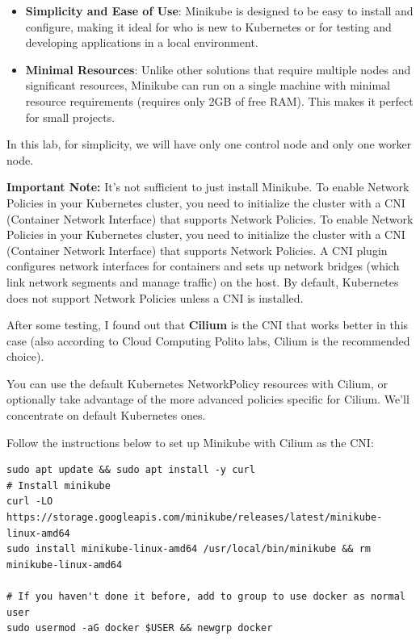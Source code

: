 \documentclass{article}
\begin{document}
\begin{enumerate}
    \begin{itemize}
        \item \textbf{Simplicity and Ease of Use}: Minikube is designed to be easy to install and configure, making it ideal for who is new to Kubernetes or for testing and developing applications in a local environment.
        \item \textbf{Minimal Resources}: Unlike other solutions that require multiple nodes and significant resources, Minikube can run on a single machine with minimal resource requirements (requires only 2GB of free RAM). This makes it perfect for small projects.
    \end{itemize}
    In this lab, for simplicity, we will have only one control node and only one worker node.

      \textbf{Important Note:} It's not sufficient to just install Minikube. To enable Network Policies in your Kubernetes cluster, you need to initialize the cluster with a CNI (Container Network Interface) that supports Network Policies. To enable Network Policies in your Kubernetes cluster, you need to initialize the cluster with a CNI (Container Network Interface) that supports Network Policies. A CNI plugin configures network interfaces for containers and sets up network bridges (which link network segments and manage traffic) on the host. By default, Kubernetes does not support Network Policies unless a CNI is installed. 
      
      After some testing, I found out that \textbf{Cilium} is the CNI that works better in this case (also according to Cloud Computing Polito labs, Cilium is the recommended choice).
      
      You can use the default Kubernetes NetworkPolicy resources with Cilium, or optionally take advantage of the more advanced policies specific for Cilium. We'll concentrate on default Kubernetes ones.
  
      Follow the instructions below to set up Minikube with Cilium as the CNI:
  
      \begin{lstlisting}
sudo apt update && sudo apt install -y curl
# Install minikube
curl -LO https://storage.googleapis.com/minikube/releases/latest/minikube-linux-amd64
sudo install minikube-linux-amd64 /usr/local/bin/minikube && rm minikube-linux-amd64

# If you haven't done it before, add to group to use docker as normal user
sudo usermod -aG docker $USER && newgrp docker


\end{lstlisting}
\end{enumerate}
\end{document}
